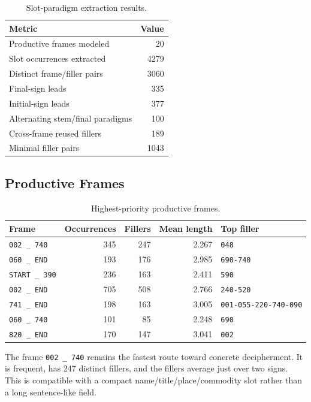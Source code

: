 \begin{table}[htbp]
\centering
\begin{tabular}{lr}
\toprule
\textbf{Metric} & \textbf{Value} \\
\midrule
Productive frames modeled & 20 \\
Slot occurrences extracted & 4279 \\
Distinct frame/filler pairs & 3060 \\
Final-sign leads & 335 \\
Initial-sign leads & 377 \\
Alternating stem/final paradigms & 100 \\
Cross-frame reused fillers & 189 \\
Minimal filler pairs & 1043 \\
\bottomrule
\end{tabular}
\caption{Slot-paradigm extraction results.}
\label{tab:slot-paradigm-summary}
\end{table}

\subsection{Productive Frames}

\begin{table}[htbp]
\centering
\begin{tabular}{lrrrl}
\toprule
\textbf{Frame} & \textbf{Occurrences} & \textbf{Fillers} & \textbf{Mean length} & \textbf{Top filler} \\
\midrule
\texttt{002 \_ 740} & 345 & 247 & 2.267 & \texttt{048} \\
\texttt{060 \_ END} & 193 & 176 & 2.985 & \texttt{690-740} \\
\texttt{START \_ 390} & 236 & 163 & 2.411 & \texttt{590} \\
\texttt{002 \_ END} & 705 & 508 & 2.766 & \texttt{240-520} \\
\texttt{741 \_ END} & 198 & 163 & 3.005 & \texttt{001-055-220-740-090} \\
\texttt{060 \_ 740} & 101 & 85 & 2.248 & \texttt{690} \\
\texttt{820 \_ END} & 170 & 147 & 3.041 & \texttt{002} \\
\bottomrule
\end{tabular}
\caption{Highest-priority productive frames.}
\label{tab:slot-productive-frames}
\end{table}

The frame \texttt{002 \_ 740} remains the fastest route toward concrete decipherment. It is frequent, has 247 distinct fillers, and the fillers average just over two signs. This is compatible with a compact name/title/place/commodity slot rather than a long sentence-like field.

